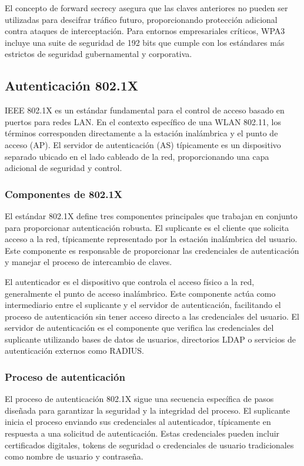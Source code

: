 El concepto de forward secrecy asegura que las claves anteriores no pueden ser utilizadas para descifrar tráfico futuro, proporcionando protección adicional contra ataques de interceptación. Para entornos empresariales críticos, WPA3 incluye una suite de seguridad de 192 bits que cumple con los estándares más estrictos de seguridad gubernamental y corporativa.

\subsection{Autenticación 802.1X}

IEEE 802.1X es un estándar fundamental para el control de acceso basado en puertos para redes LAN. En el contexto específico de una WLAN 802.11, los términos corresponden directamente a la estación inalámbrica y el punto de acceso (AP). El servidor de autenticación (AS) típicamente es un dispositivo separado ubicado en el lado cableado de la red, proporcionando una capa adicional de seguridad y control.

\subsubsection{Componentes de 802.1X}

El estándar 802.1X define tres componentes principales que trabajan en conjunto para proporcionar autenticación robusta. El suplicante es el cliente que solicita acceso a la red, típicamente representado por la estación inalámbrica del usuario. Este componente es responsable de proporcionar las credenciales de autenticación y manejar el proceso de intercambio de claves.

El autenticador es el dispositivo que controla el acceso físico a la red, generalmente el punto de acceso inalámbrico. Este componente actúa como intermediario entre el suplicante y el servidor de autenticación, facilitando el proceso de autenticación sin tener acceso directo a las credenciales del usuario. El servidor de autenticación es el componente que verifica las credenciales del suplicante utilizando bases de datos de usuarios, directorios LDAP o servicios de autenticación externos como RADIUS.

\subsubsection{Proceso de autenticación}

El proceso de autenticación 802.1X sigue una secuencia específica de pasos diseñada para garantizar la seguridad y la integridad del proceso. El suplicante inicia el proceso enviando sus credenciales al autenticador, típicamente en respuesta a una solicitud de autenticación. Estas credenciales pueden incluir certificados digitales, tokens de seguridad o credenciales de usuario tradicionales como nombre de usuario y contraseña.

